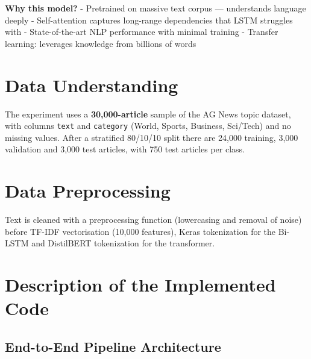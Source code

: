 \documentclass[12pt,a4paper,oneside]{report}
\begin{document}
\textbf{Why this model?}
- Pretrained on massive text corpus --- understands language deeply
- Self-attention captures long-range dependencies that LSTM struggles with
- State-of-the-art NLP performance with minimal training
- Transfer learning: leverages knowledge from billions of words

\section{Data Understanding}
The experiment uses a \textbf{30,000-article} sample of the AG News topic dataset, with columns \texttt{text} and \texttt{category} (World, Sports, Business, Sci/Tech) and no missing values. After a stratified 80/10/10 split there are 24,000 training, 3,000 validation and 3,000 test articles, with 750 test articles per class.


\section{Data Preprocessing}
Text is cleaned with a preprocessing function (lowercasing and removal of noise) before TF-IDF vectorisation (10,000 features), Keras tokenization for the Bi-LSTM and DistilBERT tokenization for the transformer.


\section{Description of the Implemented Code}
\hypertarget{end-to-end-pipeline-architecture}{%
\subsection{End-to-End Pipeline Architecture}\label{end-to-end-pipeline-architecture}}
\end{document}
